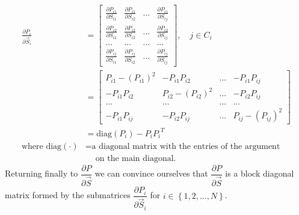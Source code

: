 \documentclass{article}
\begin{document}
\begin{equation}
\label{eqn:dp_ds_submatrices}
\begin{aligned}
\frac{\partial P_i}{\partial \vec{S}_{i}} &= \left[ \begin{array}{cccc}
\frac{\partial P_{i1}}{\partial S_{i1}} & \frac{\partial P_{i1}}{\partial S_{i2}} & ... & \frac{\partial P_{i1}}{\partial S_{ij}}
\\[1.2ex]
\frac{\partial P_{i2}}{\partial S_{i1}} & \frac{\partial P_{i2}}{\partial S_{i2}} & ... & \frac{\partial P_{i2}}{\partial S_{ij}}
\\
... & ... & ... & ...
\\[1.2ex]
\frac{\partial P_{ij}}{\partial S_{i1}} & \frac{\partial P_{ij}}{\partial S_{i2}} & ... & \frac{\partial P_{ij}}{\partial S_{ij}}
\end{array} \right], \quad j \in C_i
\\
&= \left[ \begin{array}{cccc}
P_{i 1} - \left( P_{i 1} \right)^2 &-P_{i 1} P_{i 2} & ... & -P_{i 1} P_{i j}
\\[1.2ex]
-P_{i 1} P_{i 2}& P_{i 2} - \left( P_{i 2} \right)^2 & ... & -P_{i 2} P_{i j}
\\
... & ... & ... & ...
\\[1.2ex]
-P_{i 1} P_{i j} & -P_{i 2} P_{i j} & ... & P_{i j} - \left( P_{i j} \right)^2
\end{array} \right]
\\
&= \textrm{diag} \left( P_i \right) - P_i {P_i}^T
\\
\textrm{where diag} \left( \cdot \right) &= \textrm{a diagonal matrix with the entries of the argument}
\\
&\quad \ \textrm{on the main diagonal.}
\end{aligned}
\end{equation}
Returning finally to $\dfrac{\partial P}{\partial \vec{S}}$ we can convince ourselves that $\dfrac{\partial P}{\partial \vec{S}}$ is a block diagonal matrix formed by the submatrices $\dfrac{\partial P_i}{\partial \vec{S}_i}$ for $i \in \left\lbrace 1, 2, ..., N \right\rbrace$. 
\end{document}
